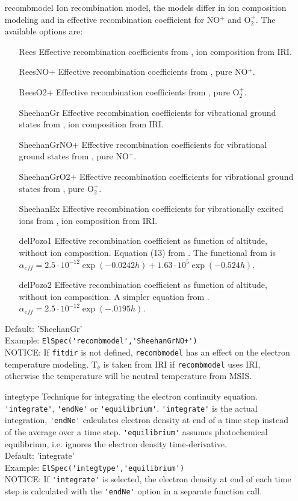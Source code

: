 \documentclass[12pt,a4paper]{report}
\begin{document}
\begin{itemize}
\item[recombmodel] Ion recombination model, the models differ in ion composition modeling and in effective recombination coefficient for NO$^+$ and O$_2^+$. The available options are:
\begin{itemize}
\item[Rees] Effective recombination coefficients from \cite{rees1989}, ion composition from IRI. 
\item[ReesNO+] Effective recombination coefficients from \cite{rees1989}, pure NO$^+$.
\item[ReesO2+] Effective recombination coefficients from \cite{rees1989}, pure O$_2^+$.
\item[SheehanGr] Effective recombination coefficients for vibrational ground states from \cite{sheehan2004}, ion composition from IRI. 
\item[SheehanGrNO+] Effective recombination coefficients for vibrational ground states from \cite{sheehan2004}, pure NO$^+$.
\item[SheehanGrO2+] Effective recombination coefficients for vibrational ground states from \cite{sheehan2004}, pure O$_2^+$.
\item[SheehanEx] Effective recombination coefficients for vibrationally excited ions from \cite{sheehan2004}, ion composition from IRI. 
\item[delPozo1] Effective recombination coefficient as function of altitude, without ion composition. Equation (13) from \cite{delpozo1997}. The functional from is $\alpha_{eff} = 2.5\cdot10^{-12}\exp{(-0.0242h)} + 1.63\cdot10^5\exp{(-0.524h)}$.
\item[delPozo2] Effective recombination coefficient as function of altitude, without ion composition. A simpler equation from \cite[page 1934][]{delpozo1997}. $\alpha_{eff} = 2.5\cdot10^{-12}\exp{(-.0195h)}$.
\end{itemize}
Default: 'SheehanGr'\\
Example: \verb|ElSpec('recombmodel','SheehanGrNO+')|\\
NOTICE: If \verb|fitdir| is not defined, \verb|recombmodel| has an effect on the electron temperature modeling. $\mathrm{T_e}$ is taken from IRI if \verb|recombmodel| uses IRI, otherwise the temperature will be neutral temperature from MSIS. \\

\item[integtype] Technique for integrating the electron continuity equation. \verb|'integrate'|, \verb|'endNe'| or \verb|'equilibrium'|. \verb|'integrate'| is the actual integration, \verb|'endNe'| calculates electron density at end of a time step instead of the average over a time step. \verb|'equilibrium'| assumes photochemical equilibrium, i.e. ignores the electron density time-derivative. \\
Default: 'integrate'\\
Example: \verb|ElSpec('integtype','equilibrium')|\\
NOTICE: If  \verb|'integrate'| is selected, the electron density at end of each time step is calculated with the  \verb|'endNe'| option in a separate function call. \\


\end{itemize}
\end{document}
